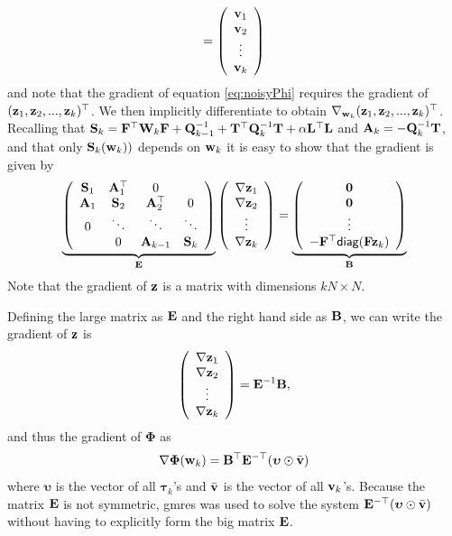 \documentclass[11pt]{article}
\newcommand{\bfA}	{{\bf{A}}}
\newcommand{\bfB}	{{\bf{B}}}
\newcommand{\bfE}	{{\bf{E}}}
\newcommand{\bfF}	{{\bf{F}}}
\newcommand{\bfL}	{{\bf{L}}}
\newcommand{\bfQ}	{{\bf{Q}}}
\newcommand{\bfS}	{{\bf{S}}}
\newcommand{\bfT}	{{\bf{T}}}
\newcommand{\bfW}	{{\bf{W}}}
\newcommand{\bfv}	{{\bf{v}}}
\newcommand{\bfw}	{{\bf{w}}}
\newcommand{\bfz}	{{\bf{z}}}
\newcommand{\bfPhi}     {{\boldsymbol \Phi}}
\newcommand{\bftau}      {{\boldsymbol \tau}}
\newcommand{\bfupsilon}      {{\boldsymbol \upsilon}}
\newcommand{\LtL}       { \bfL^{\top}\bfL}
\newcommand {\zero}  { {\bf 0} }
\newcommand{\grad}	{\ensuremath {{\bf{ \nabla}}}}
\begin{document}
{\begin{equation}
  =
  \left(\begin{array}{c} \bfv_1 \\ \bfv_2\\ \vdots\\ \bfv_k \end{array}\right)
\end{equation}
and note that the gradient of equation \eqref{eq:noisyPhi} requires the gradient of $(\bfz_1,\bfz_2,...,\bfz_k)^{\top}$. We then implicitly differentiate to obtain $\nabla_{\bfw_k} (\bfz_1,\bfz_2,...,\bfz_k)^{\top}$. Recalling that $\bfS_k = \bfF^{\top}\bfW_{k}\bfF + \bfQ^{-1}_{k-1} + \bfT^{\top}\bfQ^{-1}_{k}\bfT +\alpha\LtL$  and $\bfA_k = -\bfQ^{-1}_k \bfT$, and that only $\bfS_k(\bfw_k))$ depends on $\bfw_k$ it is easy to show that the gradient is given by 
\begin{equation}
\label{eq:gradSys}
\underbrace{\left(\begin{array}{cccc}
 \bfS_1 &  \bfA^{\top}_1 & 0 & \\
 \bfA_1 & \bfS_2 & \bfA^{\top}_2 & 0 \\
 0 & \ddots & \ddots & \ddots \\
 & 0 & \bfA_{k-1} & \bfS_k
  \end{array}\right)}_{\bfE}
  \left(\begin{array}{c} \grad\bfz_1 \\ \grad\bfz_2\\ \vdots\\ \grad\bfz_k \end{array}\right)
  =
  \underbrace{\left(\begin{array}{c} \zero \\ \zero\\ \vdots\\ -\bfF^{\top}{\sf diag}(\bfF\bfz_k) \end{array}\right)}_{\bfB}
\end{equation}
Note that the gradient of $\bfz$ is a matrix with dimensions $kN\times  N$. 

Defining the large matrix as $\bfE$ and the right hand side as $\bfB$, we can write the gradient of $\bfz$ is 
\begin{equation}
\left(\begin{array}{c} \grad\bfz_1 \\ \grad\bfz_2\\ \vdots\\ \grad\bfz_k \end{array}\right) = \bfE^{-1}\bfB,
\end{equation}
and thus the gradient of $\bfPhi$ as
\begin{equation}
\nabla \bfPhi(\bfw_k) = \bfB^{\top}\bfE^{- \top}(\bfupsilon \odot \bar{\bfv})
\end{equation}
where $\bfupsilon$ is the vector of all $\bftau_k$'s and $\bar{\bfv}$ is the vector of all $\bfv_k$'s.
Because the matrix $\bfE$ is not symmetric, gmres was used to solve the system $\bfE^{-\top}(\bfupsilon \odot \bar{\bfv})$ without having to explicitly form the big matrix $\bfE$.
 





}
\end{document}
